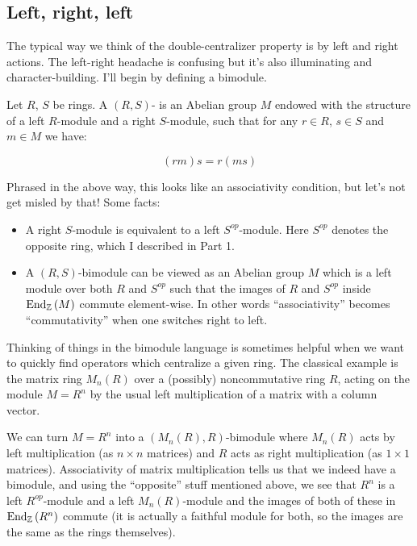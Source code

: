 \documentclass[a4paper]{amsart}
\newcommand{\Endo}[2]{\text{End}_{#1}\left(#2\right)}
\begin{document}
\subsection{Left, right, left}

The typical way we think of the double-centralizer property is by left
and right actions. The left-right headache is confusing but it's also
illuminating and character-building. I'll begin by defining a bimodule.

\begin{definer}[Bimodule]
  Let $R$, $S$ be rings. A $(R,S)$- is an Abelian
  group $M$ endowed with the structure of a left $R$-module and a
  right $S$-module, such that for any $r \in R$, $s \in S$ and $m \in
  M$ we have:

  $$(rm)s = r(ms)$$
\end{definer}

Phrased in the above way, this looks like an associativity condition,
but let's not get misled by that! Some facts:

\begin{itemize}

\item A right $S$-module is equivalent to a left $S^{op}$-module. Here
  $S^{op}$ denotes the opposite ring, which I described in Part 1.
\item A $(R,S)$-bimodule can be viewed as an Abelian group $M$ which
  is a left module over both $R$ and $S^{op}$ such that the images of
  $R$ and $S^{op}$ inside $\Endo{\Z}{M}$ commute element-wise. In
  other words ``associativity'' becomes ``commutativity'' when one
  switches right to left.

\end{itemize}

Thinking of things in the bimodule language is sometimes helpful when
we want to quickly find operators which centralize a given ring.  The
classical example is the matrix ring $M_n(R)$ over a (possibly)
noncommutative ring $R$, acting on the module $M = R^n$ by the usual
left multiplication of a matrix with a column vector.

We can turn $M = R^n$ into a $(M_n(R),R)$-bimodule where $M_n(R)$ acts
by left multiplication (as $n \times n$ matrices) and $R$ acts as
right multiplication (as $1 \times 1$ matrices). Associativity of
matrix multiplication tells us that we indeed have a bimodule, and
using the ``opposite'' stuff mentioned above, we see that $R^n$ is a
left $R^{op}$-module and a left $M_n(R)$-module and the images of both
of these in $\Endo{\Z}{R^n}$ commute (it is actually a faithful module
for both, so the images are the same as the rings themselves).
\end{document}
